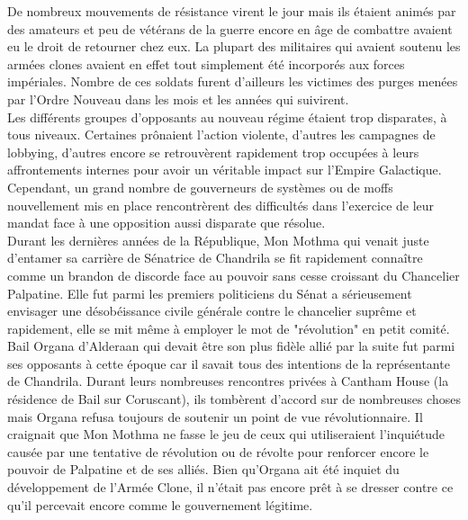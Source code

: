\documentclass[twoside]{article}
\begin{document}
De nombreux mouvements de résistance virent le jour mais ils étaient animés par des amateurs et peu de vétérans de la guerre encore en âge de combattre avaient eu le droit de retourner chez eux. La plupart des militaires qui avaient soutenu les armées clones avaient en effet tout simplement été incorporés aux forces impériales. Nombre de ces soldats furent d'ailleurs les victimes des purges menées par l'Ordre Nouveau dans les mois et les années qui suivirent.\\

Les différents groupes d'opposants au nouveau régime étaient trop disparates, à tous niveaux. Certaines prônaient l'action violente, d'autres les campagnes de lobbying, d'autres encore se retrouvèrent rapidement trop occupées à leurs affrontements internes pour avoir un véritable impact sur l'Empire Galactique. Cependant, un grand nombre de gouverneurs de systèmes ou de moffs nouvellement mis en place rencontrèrent des difficultés dans l'exercice de leur mandat face à une opposition aussi disparate que résolue.\\

Durant les dernières années de la République, Mon Mothma qui venait juste d'entamer sa carrière de Sénatrice de Chandrila se fit rapidement conna\^{i}tre comme un brandon de discorde face au pouvoir sans cesse croissant du Chancelier Palpatine. Elle fut parmi les premiers politiciens du Sénat a sérieusement envisager une désobéissance civile générale contre le chancelier suprême et rapidement, elle se mit même à employer le mot de "révolution" en petit comité.\\

Bail Organa d'Alderaan qui devait être son plus fidèle allié par la suite fut parmi ses opposants à cette époque car il savait tous des intentions de la représentante de Chandrila. Durant leurs nombreuses rencontres privées à Cantham House (la résidence de Bail sur Coruscant), ils tombèrent d'accord sur de nombreuses choses mais Organa refusa toujours de soutenir un point de vue révolutionnaire. Il craignait que Mon Mothma ne fasse le jeu de ceux qui utiliseraient l'inquiétude causée par une tentative de révolution ou de révolte pour renforcer encore le pouvoir de Palpatine et de ses alliés. Bien qu'Organa ait été inquiet du développement de l'Armée Clone, il  n'était pas encore prêt à se dresser contre ce qu'il percevait encore comme le gouvernement légitime.\\
\end{document}
